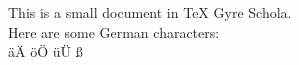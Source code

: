 \documentclass{article}
\begin{document}
This is a small document in TeX Gyre Schola.
\\
Here are some German characters:
\\
äÄ öÖ üÜ ß
\end{document}
